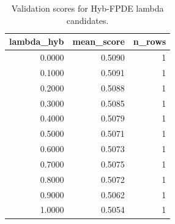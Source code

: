 \begin{table}[t]
\caption{Validation scores for Hyb-FPDE lambda candidates.}
\label{tab:lambda_distribution_computed}
\centering
\begin{tabular}{rrr}
\toprule
lambda\_hyb & mean\_score & n\_rows \\
\midrule
0.0000 & 0.5090 & 1 \\
0.1000 & 0.5091 & 1 \\
0.2000 & 0.5088 & 1 \\
0.3000 & 0.5085 & 1 \\
0.4000 & 0.5079 & 1 \\
0.5000 & 0.5071 & 1 \\
0.6000 & 0.5073 & 1 \\
0.7000 & 0.5075 & 1 \\
0.8000 & 0.5072 & 1 \\
0.9000 & 0.5062 & 1 \\
1.0000 & 0.5054 & 1 \\
\bottomrule
\end{tabular}

\end{table}

